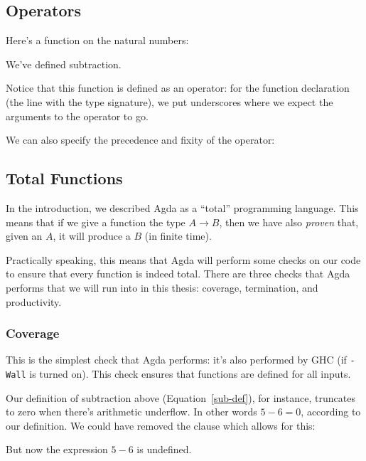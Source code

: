 \subsection{Operators}
Here's a function on the natural numbers:
\begin{agdalisting} \label{sub-def}
\end{agdalisting}
We've defined subtraction.

Notice that this function is defined as an operator: for the function
declaration (the line with the type signature), we put underscores where we
expect the arguments to the operator to go.

We can also specify the precedence and fixity of the operator:
\begin{agdalisting*}
\end{agdalisting*}
\subsection{Total Functions}
In the introduction, we described Agda as a ``total'' programming language.
This means that if we give a function the type \(A \rightarrow B\), then we have
also \emph{proven} that, given an \(A\), it will produce a \(B\) (in finite
time).

Practically speaking, this means that Agda will perform some checks on our
code to ensure that every function is indeed total.
There are three checks that Agda performs that we will run into in this thesis:
coverage, termination, and productivity.
\subsubsection{Coverage}
This is the simplest check that Agda performs: it's also performed by GHC (if
\verb+-Wall+ is turned on).
This check ensures that functions are defined for all inputs.

Our definition of subtraction above (Equation~\ref{sub-def}), for instance,
truncates to zero when there's arithmetic underflow.
In other words \(5 - 6 = 0\), according to our definition.
We could have removed the clause which allows for this:
\begin{agdalisting*}
\end{agdalisting*}
But now the expression \(5 - 6\) is undefined.
